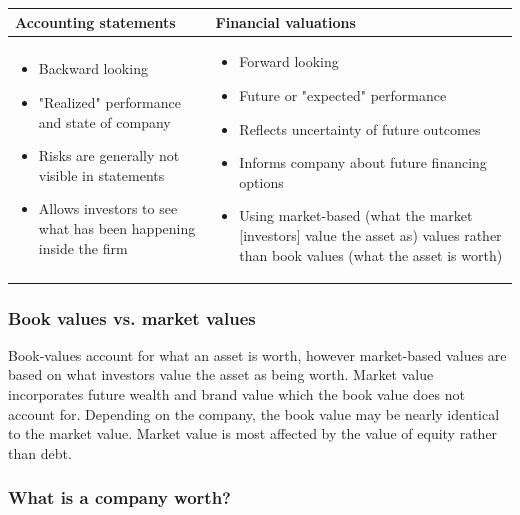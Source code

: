 \documentclass{article}
\begin{document}
			\begin{table}[H]
				\centering
				\begin{tabular}[c]{p{8cm}|p{8cm}}
					\hline
					\textbf{Accounting statements} &
					\textbf{Financial valuations}	\\
					\hline
					\begin{itemize}
						\item Backward looking
						\item "Realized" performance and state of company
						\item Risks are generally not visible in statements
						\item Allows investors to see what has been happening inside the firm
					\end{itemize}
					&
					\begin{itemize}
						\item Forward looking
						\item Future or "expected" performance
						\item Reflects uncertainty of future outcomes
						\item Informs company about future financing options
						\item Using market-based (what the market [investors] value the asset as) values rather than book values (what the asset is worth)
					\end{itemize}
					\\
					\hline
				\end{tabular}
			\end{table}

		\subsubsection{Book values vs. market values}

			Book-values account for what an asset is worth, however market-based values are based on what investors value the asset as being worth. Market value incorporates future wealth and brand value which the book value does not account for. Depending on the company, the book value may be nearly identical to the market value. Market value is most affected by the value of equity rather than debt.

		\subsubsection{What is a company worth?}
\end{document}
